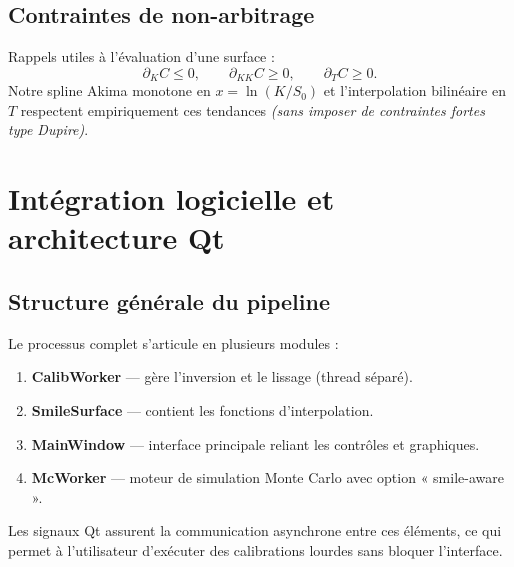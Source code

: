\documentclass[11pt,a4paper]{article}
\begin{document}
\subsection{Contraintes de non-arbitrage \label{sec:noarb}}
Rappels utiles à l'évaluation d'une surface :
\[
\partial_K C\le 0,\qquad \partial_{KK} C\ge 0,\qquad \partial_T C\ge 0.
\]
Notre spline Akima monotone en $x=\ln(K/S_0)$ et l'interpolation bilinéaire en $T$ respectent
empiriquement ces tendances \emph{(sans imposer de contraintes fortes type Dupire)}.

\section{Intégration logicielle et architecture Qt}

\subsection{Structure générale du pipeline}
Le processus complet s’articule en plusieurs modules :
\begin{enumerate}
  \item \textbf{CalibWorker} — gère l’inversion et le lissage (thread séparé).
  \item \textbf{SmileSurface} — contient les fonctions d’interpolation.
  \item \textbf{MainWindow} — interface principale reliant les contrôles et graphiques.
  \item \textbf{McWorker} — moteur de simulation Monte Carlo avec option « smile-aware ».
\end{enumerate}

Les signaux Qt assurent la communication asynchrone entre ces éléments, ce qui permet à l’utilisateur d’exécuter des calibrations lourdes sans bloquer l’interface.
\end{document}
